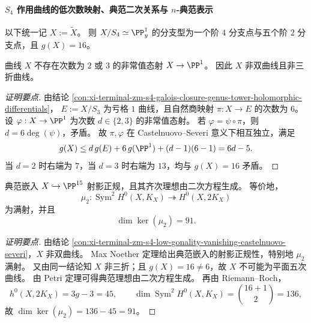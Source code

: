 \paragraph{\texorpdfstring{$S_4$}{S4} 作用曲线的低次数映射、典范二次关系与 \texorpdfstring{$n$}{n}-典范表示}
以下统一记 \(X:=\widetilde{X}\)。
则 \(X/S_4\simeq \PP^1_y\) 的分支型为一个阶 \(4\) 分支点与五个阶 \(2\) 分支点，且 \(g(X)=16\)。

\begin{conclusion}\label{con:xi-terminal-zm-s4-low-gonality-vanishing-castelnuovo-severi}
曲线 \(X\) 不存在次数为 \(2\) 或 \(3\) 的非常值态射 \(X\to \PP^1\)。
因此 \(X\) 非双曲线且非三折曲线。
\end{conclusion}
\begin{proof}[证明要点]
由结论 \ref{con:xi-terminal-zm-s4-galois-closure-genus-tower-holomorphic-differentials}，
\(E:=X/S_3\) 为亏格 \(1\) 曲线，且自然商映射 \(\pi:X\to E\) 的次数为 \(6\)。
设 \(\varphi:X\to \PP^1\) 为次数 \(d\in\{2,3\}\) 的非常值态射。
若 \(\varphi=\psi\circ\pi\)，则 \(d=6\deg(\psi)\)，矛盾。
故 \(\pi,\varphi\) 在 Castelnuovo--Severi 意义下相互独立，满足
\[
g(X)\le d\,g(E)+6\,g(\PP^1)+(d-1)(6-1)=6d-5.
\]
当 \(d=2\) 时右端为 \(7\)，当 \(d=3\) 时右端为 \(13\)，均与 \(g(X)=16\) 矛盾。
\end{proof}

\begin{conclusion}[典范模型的射影正规性与二次生成]\label{con:xi-terminal-zm-s4-canonical-projective-normality-quadratic-generation}
典范嵌入 \(X\hookrightarrow \PP^{15}\) 射影正规，且其齐次理想由二次方程生成。
等价地，
\[
\mu_2:\operatorname{Sym}^2 H^0(X,K_X)\twoheadrightarrow H^0(X,2K_X)
\]
为满射，并且
\[
\dim\ker(\mu_2)=91.
\]
\end{conclusion}
\begin{proof}[证明要点]
由结论 \ref{con:xi-terminal-zm-s4-low-gonality-vanishing-castelnuovo-severi}，\(X\) 非双曲线。
Max Noether 定理给出典范嵌入的射影正规性，特别地 \(\mu_2\) 满射。
又由同一结论知 \(X\) 非三折；且 \(g(X)=16\neq 6\)，故 \(X\) 不可能为平面五次曲线。
由 Petri 定理可得典范理想由二次方程生成。
再由 Riemann--Roch，
\[
h^0(X,2K_X)=3g-3=45,\qquad
\dim\operatorname{Sym}^2 H^0(X,K_X)=\binom{16+1}{2}=136,
\]
故 \(\dim\ker(\mu_2)=136-45=91\)。
\end{proof}

